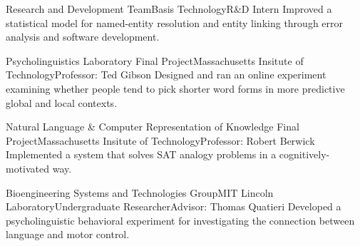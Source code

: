 \documentclass[11pt,letter]{moderncv}
\begin{document}
\raggedright
{}%
{Research and Development Team}{Basis Technology}{R\&D Intern}{}{
%
Improved a statistical model for named-entity resolution and entity linking through error analysis and software development.
%
}
\vspace*{0.2em}

\raggedright
{}%
{Psycholinguistics Laboratory Final Project}{Massachusetts Insitute of Technology}{}{Professor: Ted Gibson}{
%
Designed and ran an online experiment examining whether people tend to pick shorter word forms in more predictive global and local contexts.
%
}
\vspace*{0.2em}

\raggedright
{}%
{Natural Language \& Computer Representation of Knowledge Final Project}{Massachusetts Insitute of Technology}{}{Professor: Robert Berwick}{
%
Implemented a system that solves SAT analogy problems in a cognitively-motivated way.
%
}
\vspace*{0.2em}

\raggedright
{}%
{Bioengineering Systems and Technologies Group}{MIT Lincoln Laboratory}{Undergraduate Researcher}{Advisor: Thomas Quatieri}{
%
Developed a psycholinguistic behavioral experiment for investigating the connection between language and motor control.
%
}


%
%


\vspace*{0.25em}
\end{document}
